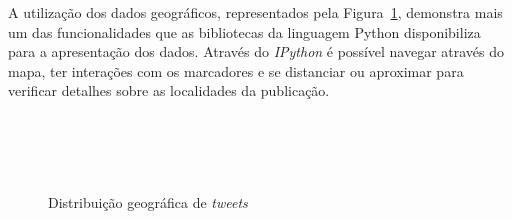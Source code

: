 A utilização dos dados geográficos, representados pela Figura~\ref{fig:mapa}, demonstra mais um das funcionalidades que as bibliotecas da linguagem Python disponibiliza para a apresentação dos dados. Através do \textit{IPython} é possível navegar através do mapa, ter interações com os marcadores e se distanciar ou aproximar para verificar detalhes sobre as localidades da publicação. \\ \\ \\ \\ \\

\begin{figure}[h]
	\centering
	\caption{Distribuição geográfica de \textit{tweets}}
	\vspace{-0.3cm}
	\label{fig:mapa}
\end{figure}

\begin{grafico}[h!]
	\centering
	\caption{Publicação de \textit{tweets} por hora}
	\vspace{-0.3cm}
	\label{time}
\end{grafico}

